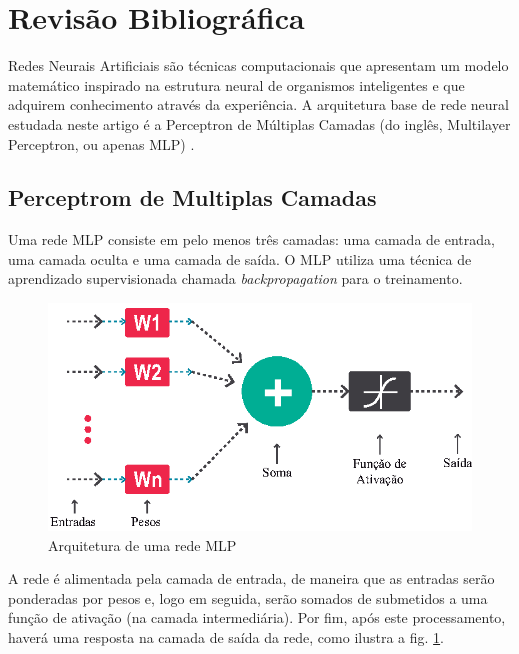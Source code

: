 \section{Revisão Bibliográfica} \label{revisaobibliografica}

Redes Neurais Artificiais são técnicas computacionais que apresentam um modelo matemático inspirado na estrutura neural de organismos inteligentes e que adquirem conhecimento através da experiência. A arquitetura base de rede neural estudada neste artigo é a Perceptron de Múltiplas Camadas (do inglês, Multilayer Perceptron, ou apenas MLP) \cite{kovacs2002redes}.

\subsection{Perceptrom de Multiplas Camadas}

Uma rede MLP consiste em pelo menos três camadas: uma camada de entrada, uma camada oculta e uma camada de saída. O MLP utiliza uma técnica de aprendizado supervisionada chamada \textit{backpropagation} para o treinamento.

\begin{figure}[H]

\centering %
\includegraphics{04-Figuras/Arquitetura}

\caption{Arquitetura de uma rede MLP}

\label{figura:arquitetura}

\end{figure}

A rede é alimentada pela camada de entrada, de maneira que as entradas serão ponderadas por pesos e, logo em seguida, serão somados de submetidos a uma função de ativação (na camada intermediária). Por fim, após este processamento, haverá uma resposta na camada de saída da rede, como ilustra a fig. \ref{figura:arquitetura}.



